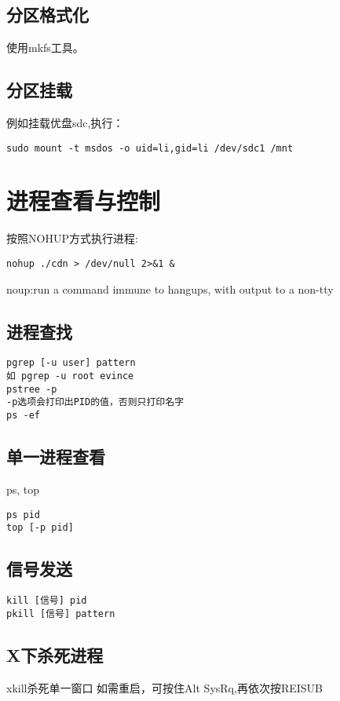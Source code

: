 \subsection{分区格式化}
使用mkfs工具。

\subsection{分区挂载}
例如挂载优盘sdc,执行：
\begin{verbatim}
sudo mount -t msdos -o uid=li,gid=li /dev/sdc1 /mnt
\end{verbatim}


\section{进程查看与控制}

按照NOHUP方式执行进程:
\begin{verbatim}
nohup ./cdn > /dev/null 2>&1 &
\end{verbatim}
noup:run a command immune to hangups, with output to a non-tty

\subsection{进程查找}
\begin{verbatim}
pgrep [-u user] pattern
如 pgrep -u root evince
pstree -p
-p选项会打印出PID的值，否则只打印名字
ps -ef
\end{verbatim}

\subsection{单一进程查看}
ps, top
\begin{verbatim}
ps pid
top [-p pid]
\end{verbatim}


\subsection{信号发送}
\begin{verbatim}
kill [信号] pid
pkill [信号] pattern
\end{verbatim}

\subsection{X下杀死进程}
xkill杀死单一窗口
如需重启，可按住Alt SysRq,再依次按REISUB



